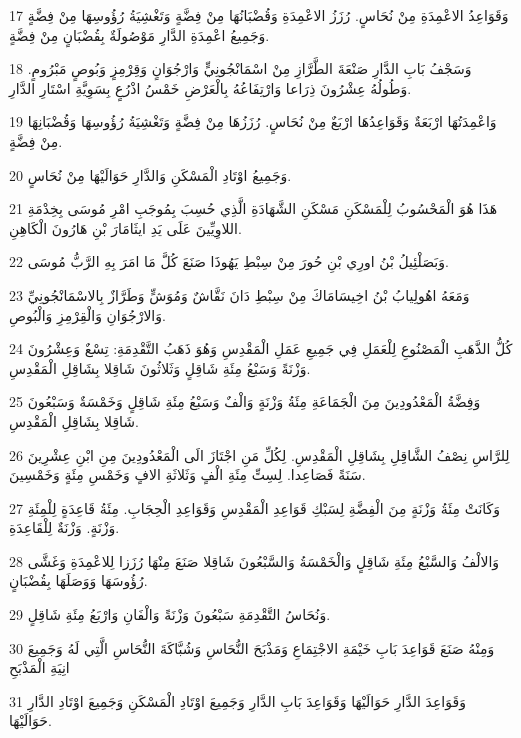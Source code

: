 \par 17 وَقَوَاعِدُ الاعْمِدَةِ مِنْ نُحَاسٍ. رُزَزُ الاعْمِدَةِ وَقُضْبَانُهَا مِنْ فِضَّةٍ وَتَغْشِيَةُ رُؤُوسِهَا مِنْ فِضَّةٍ وَجَمِيعُ اعْمِدَةِ الدَّارِ مَوْصُولَةٌ بِقُضْبَانٍ مِنْ فِضَّةٍ.
\par 18 وَسَجْفُ بَابِ الدَّارِ صَنْعَةَ الطَّرَّازِ مِنْ اسْمَانْجُونِيٍّ وَارْجُوَانٍ وَقِرْمِزٍ وَبُوصٍ مَبْرُومٍ. وَطُولُهُ عِشْرُونَ ذِرَاعا وَارْتِفَاعُهُ بِالْعَرْضِ خَمْسُ اذْرُعٍ بِسَوِيَّةِ اسْتَارِ الدَّارِ.
\par 19 وَاعْمِدَتُهَا ارْبَعَةٌ وَقَوَاعِدُهَا ارْبَعٌ مِنْ نُحَاسٍ. رُزَزُهَا مِنْ فِضَّةٍ وَتَغْشِيَةُ رُؤُوسِهَا وَقُضْبَانِهَا مِنْ فِضَّةٍ.
\par 20 وَجَمِيعُ اوْتَادِ الْمَسْكَنِ وَالدَّارِ حَوَالَيْهَا مِنْ نُحَاسٍ.
\par 21 هَذَا هُوَ الْمَحْسُوبُ لِلْمَسْكَنِ مَسْكَنِ الشَّهَادَةِ الَّذِي حُسِبَ بِمُوجَبِ امْرِ مُوسَى بِخِدْمَةِ اللاوِيِّينَ عَلَى يَدِ ايثَامَارَ بْنِ هَارُونَ الْكَاهِنِ.
\par 22 وَبَصَلْئِيلُ بْنُ اورِي بْنِ حُورَ مِنْ سِبْطِ يَهُوذَا صَنَعَ كُلَّ مَا امَرَ بِهِ الرَّبُّ مُوسَى.
\par 23 وَمَعَهُ اهُولِيابُ بْنُ اخِيسَامَاكَ مِنْ سِبْطِ دَانَ نَقَّاشٌ وَمُوَشٍّ وَطَرَّازٌ بِالاسْمَانْجُونِيِّ وَالارْجُوَانِ وَالْقِرْمِزِ وَالْبُوصِ.
\par 24 كُلُّ الذَّهَبِ الْمَصْنُوعِ لِلْعَمَلِ فِي جَمِيعِ عَمَلِ الْمَقْدِسِ وَهُوَ ذَهَبُ التَّقْدِمَةِ: تِسْعٌ وَعِشْرُونَ وَزْنَةً وَسَبْعُ مِئَةِ شَاقِلٍ وَثَلاثُونَ شَاقِلا بِشَاقِلِ الْمَقْدِسِ.
\par 25 وَفِضَّةُ الْمَعْدُودِينَ مِنَ الْجَمَاعَةِ مِئَةُ وَزْنَةٍ وَالْفٌ وَسَبْعُ مِئَةِ شَاقِلٍ وَخَمْسَةٌ وَسَبْعُونَ شَاقِلا بِشَاقِلِ الْمَقْدِسِ.
\par 26 لِلرَّاسِ نِصْفُ الشَّاقِلِ بِشَاقِلِ الْمَقْدِسِ. لِكُلِّ مَنِ اجْتَازَ الَى الْمَعْدُودِينَ مِنِ ابْنِ عِشْرِينَ سَنَةً فَصَاعِدا. لِسِتِّ مِئَةِ الْفٍ وَثَلاثَةِ الافٍ وَخَمْسِ مِئَةٍ وَخَمْسِينَ.
\par 27 وَكَانَتْ مِئَةُ وَزْنَةٍ مِنَ الْفِضَّةِ لِسَبْكِ قَوَاعِدِ الْمَقْدِسِ وَقَوَاعِدِ الْحِجَابِ. مِئَةُ قَاعِدَةٍ لِلْمِئَةِ وَزْنَةٍ. وَزْنَةٌ لِلْقَاعِدَةِ.
\par 28 وَالالْفُ وَالسَّبْعُ مِئَةِ شَاقِلٍ وَالْخَمْسَةُ وَالسَّبْعُونَ شَاقِلا صَنَعَ مِنْهَا رُزَزا لِلاعْمِدَةِ وَغَشَّى رُؤُوسَهَا وَوَصَلَهَا بِقُضْبَانٍ.
\par 29 وَنُحَاسُ التَّقْدِمَةِ سَبْعُونَ وَزْنَةً وَالْفَانِ وَارْبَعُ مِئَةِ شَاقِلٍ.
\par 30 وَمِنْهُ صَنَعَ قَوَاعِدَ بَابِ خَيْمَةِ الاجْتِمَاعِ وَمَذْبَحَ النُّحَاسِ وَشُبَّاكَةَ النُّحَاسِ الَّتِي لَهُ وَجَمِيعَ انِيَةِ الْمَذْبَحِ
\par 31 وَقَوَاعِدَ الدَّارِ حَوَالَيْهَا وَقَوَاعِدَ بَابِ الدَّارِ وَجَمِيعَ اوْتَادِ الْمَسْكَنِ وَجَمِيعَ اوْتَادِ الدَّارِ حَوَالَيْهَا.

